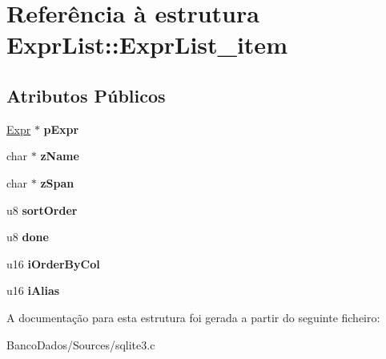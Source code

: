 \hypertarget{struct_expr_list_1_1_expr_list__item}{\section{Referência à estrutura Expr\-List\-:\-:Expr\-List\-\_\-item}
\label{struct_expr_list_1_1_expr_list__item}
}
\subsection*{Atributos Públicos}
\begin{DoxyCompactItemize}
\item 
\hypertarget{struct_expr_list_1_1_expr_list__item_a75906cf3ff19e5bf16373fec7f3c79ad}{\hyperlink{struct_expr}{Expr} $\ast$ {\bfseries p\-Expr}}\label{struct_expr_list_1_1_expr_list__item_a75906cf3ff19e5bf16373fec7f3c79ad}

\item 
\hypertarget{struct_expr_list_1_1_expr_list__item_af278eb03a1169c73d144547adaf9b04f}{char $\ast$ {\bfseries z\-Name}}\label{struct_expr_list_1_1_expr_list__item_af278eb03a1169c73d144547adaf9b04f}

\item 
\hypertarget{struct_expr_list_1_1_expr_list__item_ade485bb6fafb44ec2aba59d05b8d117b}{char $\ast$ {\bfseries z\-Span}}\label{struct_expr_list_1_1_expr_list__item_ade485bb6fafb44ec2aba59d05b8d117b}

\item 
\hypertarget{struct_expr_list_1_1_expr_list__item_af9084dc073f96792c0c7a8a894778881}{u8 {\bfseries sort\-Order}}\label{struct_expr_list_1_1_expr_list__item_af9084dc073f96792c0c7a8a894778881}

\item 
\hypertarget{struct_expr_list_1_1_expr_list__item_a84aad270c98e28a725a840aac3ee8576}{u8 {\bfseries done}}\label{struct_expr_list_1_1_expr_list__item_a84aad270c98e28a725a840aac3ee8576}

\item 
\hypertarget{struct_expr_list_1_1_expr_list__item_ae1d4a3f24152d41772694bebef2ef81c}{u16 {\bfseries i\-Order\-By\-Col}}\label{struct_expr_list_1_1_expr_list__item_ae1d4a3f24152d41772694bebef2ef81c}

\item 
\hypertarget{struct_expr_list_1_1_expr_list__item_a06fc9fdfb94d35ec6ca742da23609239}{u16 {\bfseries i\-Alias}}\label{struct_expr_list_1_1_expr_list__item_a06fc9fdfb94d35ec6ca742da23609239}

\end{DoxyCompactItemize}


A documentação para esta estrutura foi gerada a partir do seguinte ficheiro\-:\begin{DoxyCompactItemize}
\item 
Banco\-Dados/\-Sources/sqlite3.\-c\end{DoxyCompactItemize}
